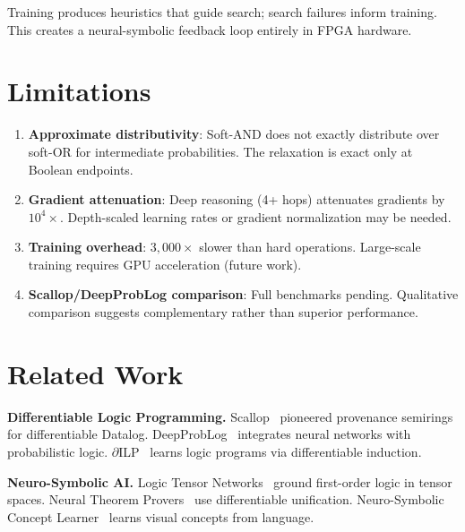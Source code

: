 \documentclass[11pt,a4paper]{article}
\begin{document}
Training produces heuristics that guide search; search failures inform training.
This creates a neural-symbolic feedback loop entirely in FPGA hardware.

\section{Limitations}
\label{sec:limitations_chirho}

\begin{enumerate}
  \item \textbf{Approximate distributivity}: Soft-AND does not exactly distribute over soft-OR for intermediate probabilities. The relaxation is exact only at Boolean endpoints.

  \item \textbf{Gradient attenuation}: Deep reasoning (4+ hops) attenuates gradients by $10^4\times$. Depth-scaled learning rates or gradient normalization may be needed.

  \item \textbf{Training overhead}: $3{,}000\times$ slower than hard operations. Large-scale training requires GPU acceleration (future work).

  \item \textbf{Scallop/DeepProbLog comparison}: Full benchmarks pending. Qualitative comparison suggests complementary rather than superior performance.
\end{enumerate}

\section{Related Work}
\label{sec:related_chirho}

\textbf{Differentiable Logic Programming.}
Scallop~\cite{scallop_chirho} pioneered provenance semirings for differentiable Datalog.
DeepProbLog~\cite{deepproblog_chirho} integrates neural networks with probabilistic logic.
$\partial$ILP~\cite{dilp_chirho} learns logic programs via differentiable induction.

\textbf{Neuro-Symbolic AI.}
Logic Tensor Networks~\cite{ltn_chirho} ground first-order logic in tensor spaces.
Neural Theorem Provers~\cite{neural_theorem_provers_chirho} use differentiable unification.
Neuro-Symbolic Concept Learner~\cite{nscl_chirho} learns visual concepts from language.
\end{document}

